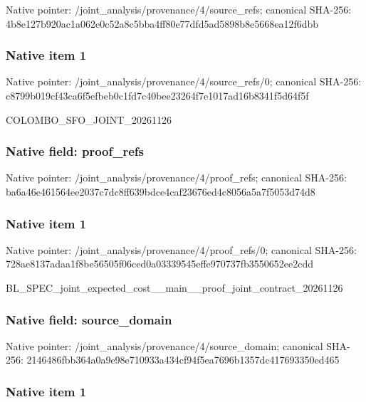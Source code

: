 \documentclass[10pt,a4paper]{article}
\begin{document}
Native pointer: /joint\_analysis/provenan\allowbreak{}ce/4/source\_refs; canonical SHA-256: 4b8e127b920ac1a062e0c52a\allowbreak{}8c5bba4ff80e77dfd5ad5898\allowbreak{}b8e5668ea12f6dbb



\subsubsection{Native item 1}


Native pointer: /joint\_analysis/provenan\allowbreak{}ce/4/source\_refs/0; canonical SHA-256: c8799b019cf43ca6f5efbeb0\allowbreak{}c1fd7c40bee23264f7e1017a\allowbreak{}d16b8341f5d64f5f


COLOMBO\_SFO\_JOINT\_20261126


\subsubsection{Native field: proof\_refs}


Native pointer: /joint\_analysis/provenance/4/proof\_refs; canonical SHA-256: ba6a46e461564ee2037c7dc8\allowbreak{}ff639bdce4caf23676ed4c80\allowbreak{}56a5a7f5053d74d8



\subsubsection{Native item 1}


Native pointer: /joint\_analysis/provenan\allowbreak{}ce/4/proof\_refs/0; canonical SHA-256: 728ae8137adaa1f8be56505f\allowbreak{}06ced0a03339545effe97073\allowbreak{}7fb3550652ee2cdd


BL\_SPEC\_joint\_expected\_c\allowbreak{}ost\_\_main\_\_proof\_joint\_c\allowbreak{}ontract\_20261126


\subsubsection{Native field: source\_domain}


Native pointer: /joint\_analysis/provenan\allowbreak{}ce/4/source\_domain; canonical SHA-256: 2146486fbb364a0a9e98e710\allowbreak{}933a434cf94f5ea7696b1357\allowbreak{}dc417693350ed465



\subsubsection{Native item 1}
\end{document}
